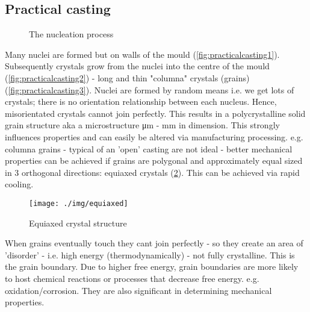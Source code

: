 \subsection{Practical casting}
\begin{figure}
  \centering
  \hfill
  \hfill
  \caption{The nucleation process}
  \label{fig:nucleationprocess}
\end{figure}
Many nuclei are formed but on walls of the mould (\ref{fig:practicalcasting1}). Subsequently crystals grow from the nuclei into the centre of the mould (\ref{fig:practicalcasting2}) - long and thin "columna" crystals (grains) (\ref{fig:practicalcasting3}). Nuclei are formed by random means i.e. we get lots of crystals; there is no orientation relationship between each nucleus. Hence, misorientated crystals cannot join perfectly. This results in a polycrystalline solid grain structure aka a microstructure \si{\micro\meter} - \si{\milli\meter} in dimension. This strongly influences properties and can easily be altered via manufacturing processing. e.g. columna grains - typical of an 'open' casting are not ideal - better mechanical properties can be achieved if grains are polygonal and approximately equal sized in 3 orthogonal directions: equiaxed crystals (\ref{fig:equiaxed}). This can be achieved via rapid cooling.
\begin{figure}[h]
  \centering
  \texttt{[image: ./img/equiaxed]}
  \caption{Equiaxed crystal structure}
  \label{fig:equiaxed}
\end{figure}
When grains eventually touch they cant join perfectly - so they create an area of 'disorder' - i.e. high energy (thermodynamically) - not fully crystalline. This is the grain boundary. Due to higher free energy, grain boundaries are more likely to host chemical reactions or processes that decrease free energy. e.g. oxidation/corrosion. They are also significant in determining mechanical properties.

